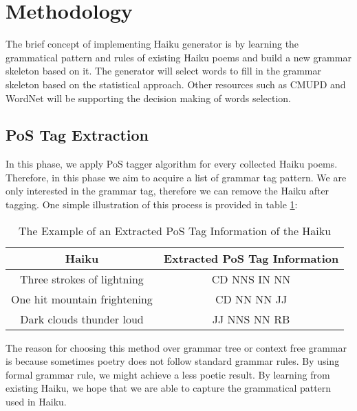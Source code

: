 

\section{Methodology}


The brief concept of implementing Haiku generator is by learning the grammatical pattern and rules of existing Haiku poems and build a new grammar skeleton based on it. The generator will select words to fill in the grammar skeleton based on the statistical approach. Other resources such as CMUPD and WordNet will be supporting the decision making of words selection.


\subsection{PoS Tag Extraction}


In this phase, we apply PoS tagger algorithm for every collected Haiku poems. Therefore, in this phase we aim to acquire a list of grammar tag pattern. We are only interested in the grammar tag, therefore we can remove the Haiku after tagging. One simple illustration of this process is provided in table \ref{exmpl}:


\begin{table}[h]

\centering

\begin{tabular}{|c|c|}

\hline Haiku & Extracted PoS Tag Information \\

\hline Three strokes of lightning & CD NNS IN NN \\ 

One hit mountain frightening &  CD NN NN JJ  \\ 

Dark clouds thunder loud &  JJ NNS NN RB \\ 

\hline

\end{tabular} 

\caption{The Example of an Extracted PoS Tag Information of the Haiku}

\label{exmpl}

\end{table}


The reason for choosing this method over grammar tree or context free grammar is because sometimes poetry does not follow standard grammar rules. By using formal grammar rule, we might achieve a less poetic result. By learning from existing Haiku, we hope that we are able to capture the grammatical pattern used in Haiku.


